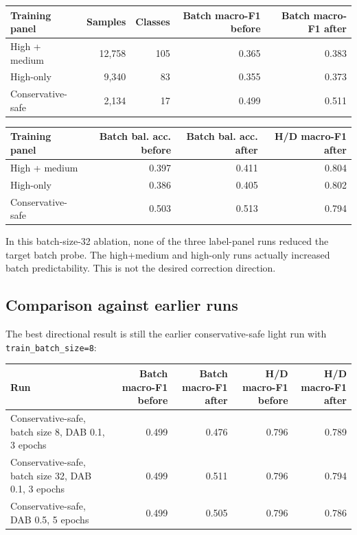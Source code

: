 \documentclass[11pt]{article}
\newcommand{\code}[1]{\texttt{\small #1}}
\begin{document}
\begin{center}
\begin{tabular}{lrrrr}
\toprule
Training panel & Samples & Classes & Batch macro-F1 before & Batch macro-F1 after \\
\midrule
High + medium & 12,758 & 105 & 0.365 & 0.383 \\
High-only & 9,340 & 83 & 0.355 & 0.373 \\
Conservative-safe & 2,134 & 17 & 0.499 & 0.511 \\
\bottomrule
\end{tabular}
\end{center}

\begin{center}
\begin{tabular}{lrrr}
\toprule
Training panel & Batch bal. acc. before & Batch bal. acc. after & H/D macro-F1 after \\
\midrule
High + medium & 0.397 & 0.411 & 0.804 \\
High-only & 0.386 & 0.405 & 0.802 \\
Conservative-safe & 0.503 & 0.513 & 0.794 \\
\bottomrule
\end{tabular}
\end{center}

In this batch-size-32 ablation, none of the three label-panel runs reduced the target
batch probe. The high+medium and high-only runs actually increased batch predictability.
This is not the desired correction direction.

\subsection{Comparison against earlier runs}

The best directional result is still the earlier conservative-safe light run with
\code{train\_batch\_size=8}:

\begin{center}
\begin{tabular}{lrrrr}
\toprule
Run & Batch macro-F1 before & Batch macro-F1 after & H/D macro-F1 before & H/D macro-F1 after \\
\midrule
Conservative-safe, batch size 8, DAB 0.1, 3 epochs & 0.499 & 0.476 & 0.796 & 0.789 \\
Conservative-safe, batch size 32, DAB 0.1, 3 epochs & 0.499 & 0.511 & 0.796 & 0.794 \\
Conservative-safe, DAB 0.5, 5 epochs & 0.499 & 0.505 & 0.796 & 0.786 \\
\bottomrule
\end{tabular}
\end{center}
\end{document}
